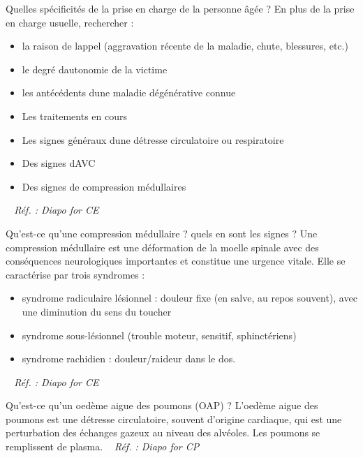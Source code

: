 \documentclass[grid,avery5371,landscape]{flashcards}
\makeatletter
\newcounter{nocarte}
\newcommand{\categ}[1]{%
  \def\@categ{#1}%
  \setcounter{nocarte}{0}%
}
\newcommand{\source}[1]{%
  \medskip
  \itshape%
   ~ \hfill Réf. : #1}
\makeatother
\begin{document}
\color[HTML]{01DF01}
\categ{CE-CP-REG}
\begin{flashcard}[CAT]{
 Quelles spécificités de la prise en charge de la personne âgée ?   }
  En plus de la prise en charge usuelle, rechercher :
    \begin{itemize}
        \item la raison de lappel (aggravation récente de la maladie, chute, blessures, etc.)
        \item le degré dautonomie de la victime
        \item les antécédents dune maladie dégénérative connue
        \item Les traitements en cours
        \item Les signes généraux dune détresse circulatoire ou respiratoire
        \item Des signes dAVC
        \item Des signes de compression médullaires
    \end{itemize}
  \source{Diapo for CE }
\end{flashcard}


\color[HTML]{01DF01}
\categ{CE-CP-REG}
\begin{flashcard}[bilan]{
 Qu'est-ce qu'une compression médullaire ? quels en sont les signes ?   }
  Une compression médullaire est une déformation de la moelle spinale avec des conséquences neurologiques importantes et constitue une urgence vitale. Elle  se caractérise par trois syndromes :
    \begin{itemize}
        \item syndrome radiculaire lésionnel : douleur fixe (en salve, au repos souvent), avec une diminution du sens du toucher
        \item syndrome sous-lésionnel (trouble moteur, sensitif, sphinctériens)
        \item syndrome rachidien : douleur/raideur dans le dos.
    \end{itemize}
  \source{Diapo for CE }
\end{flashcard}


\color[HTML]{01DF01}
\categ{CE-CP-REG}
\begin{flashcard}[bilan]{
 Qu'est-ce qu'un oedème aigue des poumons (OAP) ?    }
  L'oedème aigue des poumons est une détresse circulatoire, souvent d'origine cardiaque, qui est une perturbation des échanges gazeux au niveau des alvéoles. Les poumons se remplissent de plasma.
  \source{Diapo for CP}
\end{flashcard}
\end{document}

